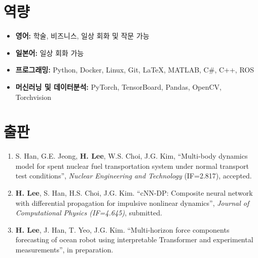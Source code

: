 \documentclass[a4paper,10pt]{extarticle}
\begin{document}
\section*{역량}
\begin{itemize}
    \item \textbf{영어: }학술, 비즈니스, 일상 회화 및 작문 가능
    \item \textbf{일본어: }일상 회화 가능
    \item \textbf{프로그래밍: }Python, Docker, Linux, Git, \LaTeX, MATLAB, C\#, C++, ROS
    \item \textbf{머신러닝 및 데이터분석:} PyTorch, TensorBoard, Pandas, OpenCV, Torchvision
\end{itemize}


\section*{출판}
\noindent
\begin{enumerate}[leftmargin=.5cm]
    \item S. Han, G.E. Jeong, \textbf{H. Lee}, W.S. Choi, J.G. Kim, “Multi-body dynamics model for spent nuclear fuel transportation system under normal transport test conditions”, \textit{Nuclear Engineering and Technology} (IF=2.817), accepted.
    \item \textbf{H. Lee}, S. Han, H.S. Choi, J.G. Kim. “cNN-DP: Composite neural network with differential propagation for impulsive nonlinear dynamics”, \textit{Journal of Computational Physics (IF=4.645)}, submitted.
    \item \textbf{H. Lee}, J. Han, T. Yeo, J.G. Kim. “Multi-horizon force components forecasting of ocean robot using interpretable Transformer and experimental measurements”, in preparation.
\end{enumerate}

\end{document}
